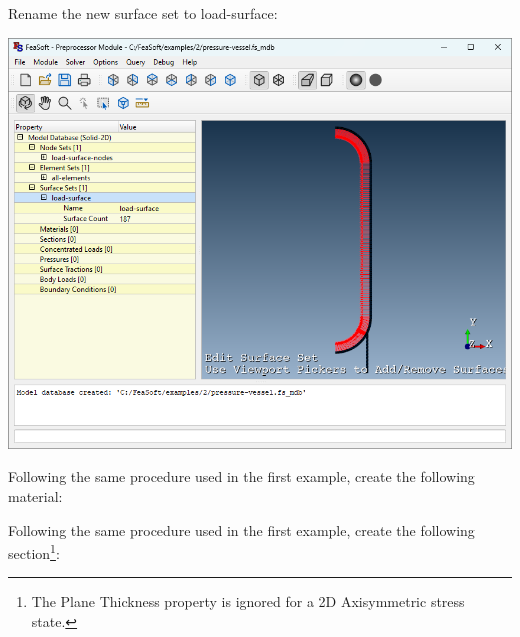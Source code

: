 \documentclass[
    11pt,        %
    a4paper,     %
    final,       %
    fleqn,       %
    notitlepage, %
    onecolumn,   %
    oneside,     %
]{article}
\begin{document}
Rename the new surface set to load-surface:
\begin{center}
    \includegraphics[scale=0.5]{fig/ui-2-3.png}
\end{center}

Following the same procedure used in the first example, create the following material:
\begin{center}
\end{center}

Following the same procedure used in the first example, create the following section\footnote{The Plane Thickness property is ignored for a 2D Axisymmetric stress state.}:
\begin{center}
\end{center}
\end{document}
